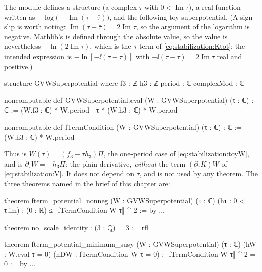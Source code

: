 The module  defines a
structure  (a complex $\tau$ with $0<\operatorname{Im}\tau$), a real
function  written as $-\log\bigl(-\operatorname{Im}(\tau-\bar\tau)\bigr)$, and
the following toy superpotential. (A sign slip is worth noting: $\operatorname{Im}(\tau-\bar\tau)=
2\operatorname{Im}\tau$, so the argument of the logarithm is negative. Mathlib's 
is defined through the absolute value, so the value is nevertheless $-\ln(2\operatorname{Im}\tau)$,
which is the $\tau$ term of \eqref{eq:stabilization:Ktot}; the intended expression is
$-\ln[-\ii(\tau-\bar\tau)]$ with $-\ii(\tau-\bar\tau)=2\operatorname{Im}\tau$ real and positive.)
\begin{leancode}
structure GVWSuperpotential where
  f3 : ℤ
  h3 : ℤ
  period : ℂ
  complexMod : ℂ

noncomputable def GVWSuperpotential.eval (W : GVWSuperpotential) (τ : ℂ) : ℂ :=
  (W.f3 : ℂ) * W.period - τ * (W.h3 : ℂ) * W.period

noncomputable def fTermCondition (W : GVWSuperpotential) (τ : ℂ) : ℂ :=
  -(W.h3 : ℂ) * W.period
\end{leancode}
Thus  is $W(\tau)=(f_3-\tau h_3)\Pi$, the one-period case of
\eqref{eq:stabilization:toyW}, and  is $\partial_\tau W=-h_3\Pi$: the
plain derivative, \emph{without} the term $(\partial_\tau K)W$ of \eqref{eq:stabilization:V}.
It does not depend on $\tau$, and  is not used by any theorem. The three
theorems named in the brief of this chapter are:
\begin{leancode}
theorem fterm_potential_nonneg (W : GVWSuperpotential) (τ : ℂ) (hτ : 0 < τ.im) :
    (0 : ℝ) ≤ ‖fTermCondition W τ‖ ^ 2 := by ...

theorem no_scale_identity :
    (3 : ℚ) = 3 := rfl

theorem fterm_potential_minimum_susy
    (W : GVWSuperpotential) (τ : ℂ)
    (hW : W.eval τ = 0) (hDW : fTermCondition W τ = 0) :
    ‖fTermCondition W τ‖ ^ 2 = 0 := by ...
\end{leancode}
